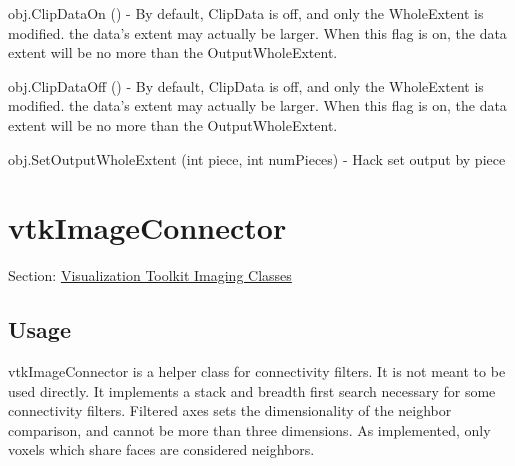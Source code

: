 \begin{DoxyItemize}
\item {\ttfamily obj.\-Clip\-Data\-On ()} -\/ By default, Clip\-Data is off, and only the Whole\-Extent is modified. the data's extent may actually be larger. When this flag is on, the data extent will be no more than the Output\-Whole\-Extent.  
\item {\ttfamily obj.\-Clip\-Data\-Off ()} -\/ By default, Clip\-Data is off, and only the Whole\-Extent is modified. the data's extent may actually be larger. When this flag is on, the data extent will be no more than the Output\-Whole\-Extent.  
\item {\ttfamily obj.\-Set\-Output\-Whole\-Extent (int piece, int num\-Pieces)} -\/ Hack set output by piece  
\end{DoxyItemize}\hypertarget{vtkimaging_vtkimageconnector}{}\section{vtk\-Image\-Connector}\label{vtkimaging_vtkimageconnector}
Section\-: \hyperlink{sec_vtkimaging}{Visualization Toolkit Imaging Classes} \hypertarget{vtkwidgets_vtkxyplotwidget_Usage}{}\subsection{Usage}\label{vtkwidgets_vtkxyplotwidget_Usage}
vtk\-Image\-Connector is a helper class for connectivity filters. It is not meant to be used directly. It implements a stack and breadth first search necessary for some connectivity filters. Filtered axes sets the dimensionality of the neighbor comparison, and cannot be more than three dimensions. As implemented, only voxels which share faces are considered neighbors.

